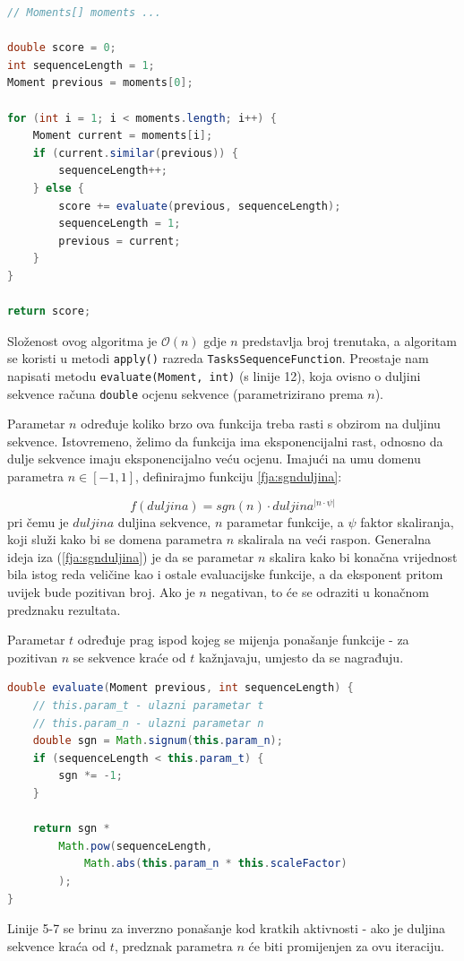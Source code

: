 \documentclass[times, utf8, zavrsni]{fer}
\begin{document}
\begin{lstlisting}[language=java, caption=Algoritam određivanja duljine sekvence aktivnosti, label={code:duljina sekvence}]
// Moments[] moments ...

double score = 0;
int sequenceLength = 1;
Moment previous = moments[0];

for (int i = 1; i < moments.length; i++) {
	Moment current = moments[i];
	if (current.similar(previous)) {
		sequenceLength++;
	} else {
		score += evaluate(previous, sequenceLength);
		sequenceLength = 1;
		previous = current;
	}
}

return score;
\end{lstlisting}
Složenost ovog algoritma je $\mathcal{O}(n)$ gdje $n$ predstavlja broj trenutaka, a algoritam se koristi u metodi \texttt{apply()} razreda \texttt{TasksSequenceFunction}. Preostaje nam napisati metodu \texttt{evaluate(Moment, int)} (s linije 12), koja ovisno o duljini sekvence računa \texttt{double} ocjenu sekvence (parametrizirano prema $n$).

Parametar $n$ određuje koliko brzo ova funkcija treba rasti s obzirom na duljinu sekvence.  Istovremeno, želimo da funkcija ima eksponencijalni rast, odnosno da dulje sekvence imaju eksponencijalno veću ocjenu. Imajući na umu domenu parametra $n \in \left[-1, 1\right]$, definirajmo funkciju \ref{fja:sgnduljina}:

\begin{equation}\label{fja:sgnduljina}
f(duljina) = sgn(n) \cdot duljina^{|{n}\cdot{\psi}|}
\end{equation}
pri čemu je $duljina$ duljina sekvence, $n$ parametar funkcije, a $\psi$ faktor skaliranja, koji služi kako bi se domena parametra $n$ skalirala na veći raspon. Generalna ideja iza (\ref{fja:sgnduljina}) je da se parametar $n$ skalira kako bi konačna vrijednost bila istog reda veličine kao i ostale evaluacijske funkcije, a da eksponent pritom uvijek bude pozitivan broj. Ako je $n$ negativan, to će se odraziti u konačnom predznaku rezultata.

Parametar $t$ određuje prag ispod kojeg se mijenja ponašanje funkcije - za pozitivan $n$ se sekvence kraće od $t$ kažnjavaju, umjesto da se nagrađuju.

\begin{lstlisting}[language=java, caption=Ocjena duljine sekvence]
double evaluate(Moment previous, int sequenceLength) {
	// this.param_t - ulazni parametar t
	// this.param_n - ulazni parametar n
	double sgn = Math.signum(this.param_n);
	if (sequenceLength < this.param_t) {
		sgn *= -1;
	}

	return sgn *
		Math.pow(sequenceLength,
			Math.abs(this.param_n * this.scaleFactor)
		);
}
\end{lstlisting}
Linije 5-7 se brinu za inverzno ponašanje kod kratkih aktivnosti - ako je duljina sekvence kraća od $t$, predznak parametra $n$ će biti promijenjen za ovu iteraciju.
\end{document}
